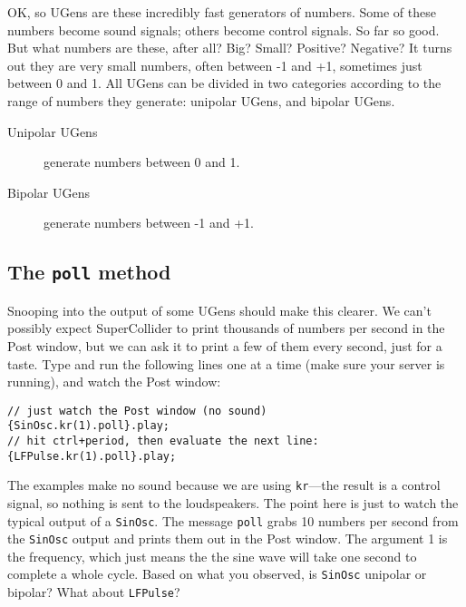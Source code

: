 OK, so UGens are these incredibly fast generators of numbers. Some of these numbers become sound signals; others become control signals. So far so good. But what numbers are these, after all? Big? Small? Positive? Negative? It turns out they are very small numbers, often between -1 and +1, sometimes just between 0 and 1. All UGens can be divided in two categories according to the range of numbers they generate: unipolar UGens, and bipolar UGens.
\begin{description}
\item[Unipolar UGens] generate numbers between 0 and 1.
\item[Bipolar UGens] generate numbers between -1 and +1.
\end{description}

\subsection{The \texttt{poll} method}

Snooping into the output of some UGens should make this clearer. We can't possibly expect SuperCollider to print thousands of numbers per second in the Post window, but we can ask it to print a few of them every second, just for a taste. Type and run the following lines one at a time (make sure your server is running), and watch the Post window:

\begin{lstlisting}[style=SuperCollider-IDE, basicstyle=\scttfamily\footnotesize]
// just watch the Post window (no sound)
{SinOsc.kr(1).poll}.play;
// hit ctrl+period, then evaluate the next line:
{LFPulse.kr(1).poll}.play;
\end{lstlisting}

The examples make no sound because we are using \texttt{kr}---the result is a control signal, so nothing is sent to the loudspeakers. The point here is just to watch the typical output of a \texttt{SinOsc}. The message \texttt{poll} grabs 10 numbers per second from the \texttt{SinOsc} output
and prints them out in the Post window. The argument 1 is the frequency, which just means the the sine wave will take one second to complete a whole cycle. Based on what you observed, is \texttt{SinOsc} unipolar or bipolar? What about \texttt{LFPulse}?

